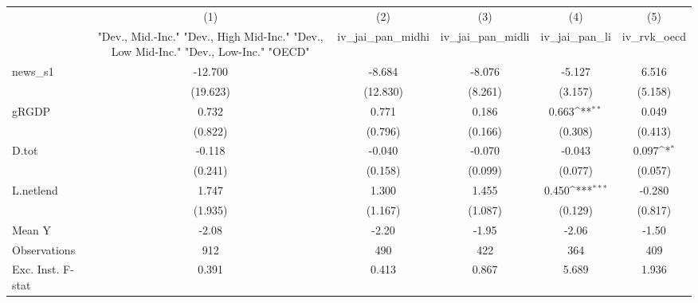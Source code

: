 {
\def\sym#1{\ifmmode^{#1}\else\(^{#1}\)\fi}
\begin{tabular}{l*{5}{c}}
\toprule
            &\multicolumn{1}{c}{(1)}&\multicolumn{1}{c}{(2)}&\multicolumn{1}{c}{(3)}&\multicolumn{1}{c}{(4)}&\multicolumn{1}{c}{(5)}\\
            &\multicolumn{1}{c}{ "Dev., Mid.-Inc." "Dev., High Mid-Inc." "Dev., Low Mid-Inc." "Dev., Low-Inc." "OECD" }&\multicolumn{1}{c}{iv\_jai\_pan\_midhi}&\multicolumn{1}{c}{iv\_jai\_pan\_midli}&\multicolumn{1}{c}{iv\_jai\_pan\_li}&\multicolumn{1}{c}{iv\_rvk\_oecd}\\
\midrule
news\_s1     &     -12.700         &      -8.684         &      -8.076         &      -5.127         &       6.516         \\
            &    (19.623)         &    (12.830)         &     (8.261)         &     (3.157)         &     (5.158)         \\
\addlinespace
gRGDP       &       0.732         &       0.771         &       0.186         &       0.663\sym{**} &       0.049         \\
            &     (0.822)         &     (0.796)         &     (0.166)         &     (0.308)         &     (0.413)         \\
\addlinespace
D.tot       &      -0.118         &      -0.040         &      -0.070         &      -0.043         &       0.097\sym{*}  \\
            &     (0.241)         &     (0.158)         &     (0.099)         &     (0.077)         &     (0.057)         \\
\addlinespace
L.netlend   &       1.747         &       1.300         &       1.455         &       0.450\sym{***}&      -0.280         \\
            &     (1.935)         &     (1.167)         &     (1.087)         &     (0.129)         &     (0.817)         \\
\midrule
Mean Y      &       -2.08         &       -2.20         &       -1.95         &       -2.06         &       -1.50         \\
Observations&         912         &         490         &         422         &         364         &         409         \\
Exc. Inst. F-stat&       0.391         &       0.413         &       0.867         &       5.689         &       1.936         \\
\bottomrule
\end{tabular}
}
